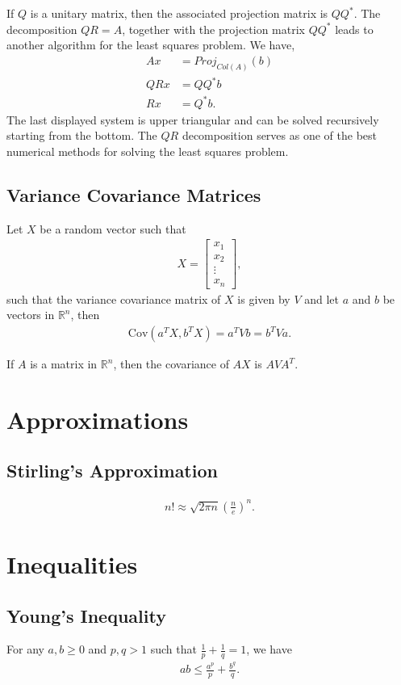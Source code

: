 \documentclass{amsart}
\theoremstyle{plain}
\numberwithin{equation}{section}
\begin{document}
If $Q$ is a unitary matrix, then the associated projection matrix 
is $QQ^*$. The decomposition $QR=A$, together with the projection matrix 
$QQ^*$ leads to another algorithm for the least squares problem. We have,
\begin{align*}
Ax &= Proj_{Col(A)}(b)\\
QRx &= QQ^*b\\
Rx &= Q^*b.
\end{align*}
The last displayed system is upper triangular and can be solved recursively 
starting from the bottom. The $QR$ decomposition serves 
as one of the best numerical methods for solving the least squares problem. 

\subsection*{Variance Covariance Matrices}
Let $X$ be a random vector such that
\begin{align*}
X = 
\begin{bmatrix}
x_1\\
x_2\\
\vdots\\
x_n
\end{bmatrix},
\end{align*}
such that the variance covariance matrix of $X$ is 
given by $V$ and let $a$ and $b$ be vectors in $\mathbb{R}^n$, then 
\begin{align*}
\mathrm{Cov}(a^TX, b^TX) = a^T V b = b^T V a.
\end{align*}

If $A$ is a matrix in $\mathbb{R}^n$, then the covariance of 
$AX$ is $AVA^T$.

\section*{Approximations}
\subsection*{Stirling's Approximation}
\begin{align*}
n! \approx \sqrt{2\pi n} \left(\frac{n}{e}\right)^n.
\end{align*}	


\section*{Inequalities}

\subsection*{Young's Inequality}
For any $a, b \geq 0$ and $p, q > 1$ such that $\frac{1}{p} + \frac{1}{q} = 1$, we have
\begin{align*}
ab \leq \frac{a^p}{p} + \frac{b^q}{q}.
\end{align*}
\end{document}
